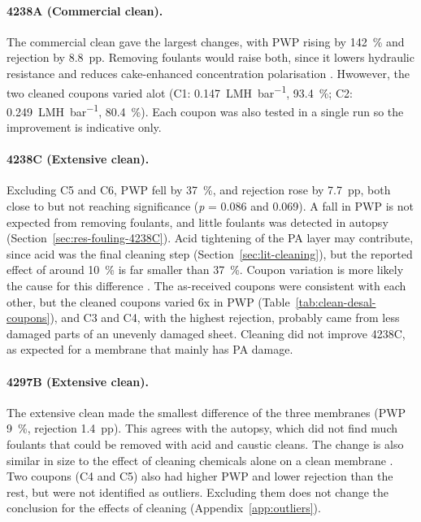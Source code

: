 \paragraph{4238A (Commercial clean).}
The commercial clean gave the largest changes, with PWP rising by \qty{142}{\percent} and rejection by \qty{8.8}{pp}. Removing foulants would raise both, since it lowers hydraulic resistance and reduces cake-enhanced concentration polarisation \citep{elimelech2005chemical}. Hwowever, the two cleaned coupons varied alot (C1: \qty{0.147}{LMH.bar^{-1}}, \qty{93.4}{\percent}; C2: \qty{0.249}{LMH.bar^{-1}}, \qty{80.4}{\percent}). Each coupon was also tested in a single run so the improvement is indicative only.

\paragraph{4238C (Extensive clean).}
Excluding C5 and C6, PWP fell by \qty{37}{\percent}, and rejection rose by \qty{7.7}{pp}, both close to but not reaching significance (\textit{p} = 0.086 and 0.069). A fall in PWP is not expected from removing foulants, and little foulants was detected in autopsy (Section~\ref{sec:res-fouling-4238C}). Acid tightening of the PA layer may contribute, since acid was the final cleaning step (Section~\ref{sec:lit-cleaning}), but the reported effect of around \qty{10}{\percent} is far smaller than \qty{37}{\percent}. Coupon variation is more likely the cause for this difference \citep{tu2015chemical}. The as-received coupons were consistent with each other, but the cleaned coupons varied 6x in PWP (Table~\ref{tab:clean-desal-coupons}), and C3 and C4, with the highest rejection, probably came from less damaged parts of an unevenly damaged sheet. Cleaning did not improve 4238C, as expected for a membrane that mainly has PA damage. 

\paragraph{4297B (Extensive clean).}
The extensive clean made the smallest difference of the three membranes (PWP \qty{+9}{\percent}, rejection \qty{+1.4}{pp}). This agrees with the autopsy, which did not find much foulants that could be removed with acid and caustic cleans. The change is also similar in size to the effect of cleaning chemicals alone on a clean membrane \citep{tu2015chemical}. Two coupons (C4 and C5) also had higher PWP and lower rejection than the rest, but were not identified as outliers. Excluding them does not change the conclusion for the effects of cleaning (Appendix~\ref{app:outliers}).

